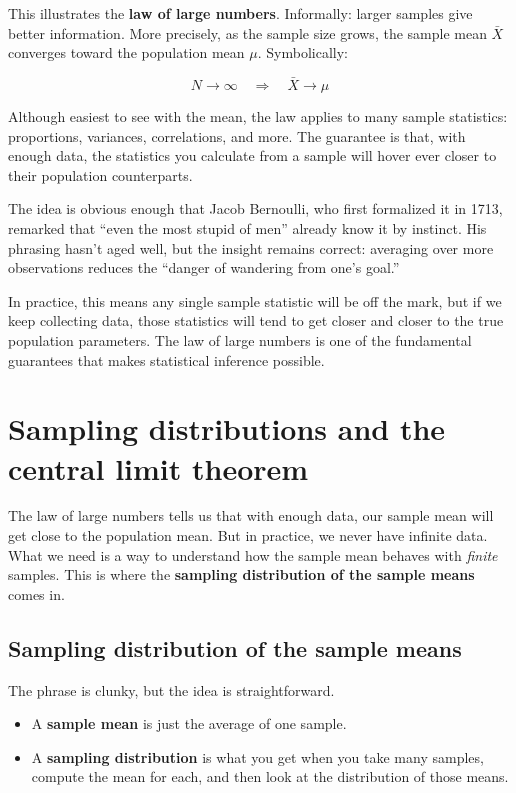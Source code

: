 \documentclass[
  letterpaper,
  DIV=11,
  numbers=noendperiod]{scrreprt}
\providecommand{\tightlist}{%
  \setlength{\itemsep}{0pt}\setlength{\parskip}{0pt}}
\begin{document}
This illustrates the \textbf{law of large numbers}. Informally: larger
samples give better information. More precisely, as the sample size
grows, the sample mean \(\bar{X}\) converges toward the population mean
\(\mu\). Symbolically:

\[
N \to \infty \quad \Rightarrow \quad \bar{X} \to \mu
\]

Although easiest to see with the mean, the law applies to many sample
statistics: proportions, variances, correlations, and more. The
guarantee is that, with enough data, the statistics you calculate from a
sample will hover ever closer to their population counterparts.

The idea is obvious enough that Jacob Bernoulli, who first formalized it
in 1713, remarked that ``even the most stupid of men'' already know it
by instinct. His phrasing hasn't aged well, but the insight remains
correct: averaging over more observations reduces the ``danger of
wandering from one's goal.''

In practice, this means any single sample statistic will be off the
mark, but if we keep collecting data, those statistics will tend to get
closer and closer to the true population parameters. The law of large
numbers is one of the fundamental guarantees that makes statistical
inference possible.

\section{Sampling distributions and the central limit
theorem}\label{sampling-distributions-and-the-central-limit-theorem}

The law of large numbers tells us that with enough data, our sample mean
will get close to the population mean. But in practice, we never have
infinite data. What we need is a way to understand how the sample mean
behaves with \emph{finite} samples. This is where the \textbf{sampling
distribution of the sample means} comes in.

\subsection{Sampling distribution of the sample
means}\label{sampling-distribution-of-the-sample-means}

The phrase is clunky, but the idea is straightforward.

\begin{itemize}
\tightlist
\item
  A \textbf{sample mean} is just the average of one sample.\\
\item
  A \textbf{sampling distribution} is what you get when you take many
  samples, compute the mean for each, and then look at the distribution
  of those means.
\end{itemize}
\end{document}
